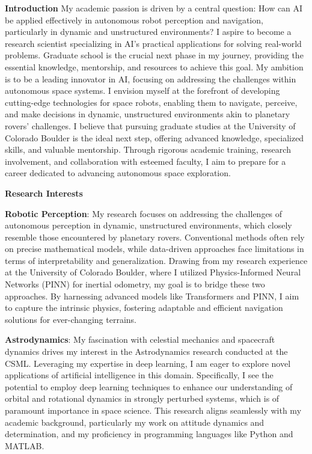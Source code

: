 \documentclass[a4,20pt]{article}
\begin{document}
\begin{large} 

\textbf{Introduction} \newline
My academic passion is driven by a central question: How can AI be applied effectively in autonomous robot perception and navigation, particularly in dynamic and unstructured environments? I aspire to become a research scientist specializing in AI's practical applications for solving real-world problems. Graduate school is the crucial next phase in my journey, providing the essential knowledge, mentorship, and resources to achieve this goal. My ambition is to be a leading innovator in AI, focusing on addressing the challenges within autonomous space systems. I envision myself at the forefront of developing cutting-edge technologies for space robots, enabling them to navigate, perceive, and make decisions in dynamic, unstructured environments akin to planetary rovers' challenges. I believe that pursuing graduate studies at the University of Colorado Boulder is the ideal next step, offering advanced knowledge, specialized skills, and valuable mentorship. Through rigorous academic training, research involvement, and collaboration with esteemed faculty, I aim to prepare for a career dedicated to advancing autonomous space exploration.

\textbf{Research Interests} \vspace{-0.35cm}

\textbf{Robotic Perception}: My research focuses on addressing the challenges of autonomous perception in dynamic, unstructured environments, which closely resemble those encountered by planetary rovers. Conventional methods often rely on precise mathematical models, while data-driven approaches face limitations in terms of interpretability and generalization. Drawing from my research experience at the University of Colorado Boulder, where I utilized Physics-Informed Neural Networks (PINN) for inertial odometry, my goal is to bridge these two approaches. By harnessing advanced models like Transformers and PINN, I aim to capture the intrinsic physics, fostering adaptable and efficient navigation solutions for ever-changing terrains.\vspace{-0.35cm}


\textbf{Astrodynamics}: My fascination with celestial mechanics and spacecraft dynamics drives my interest in the Astrodynamics research conducted at the CSML. Leveraging my expertise in deep learning, I am eager to explore novel applications of artificial intelligence in this domain. Specifically, I see the potential to employ deep learning techniques to enhance our understanding of orbital and rotational dynamics in strongly perturbed systems, which is of paramount importance in space science. This research aligns seamlessly with my academic background, particularly my work on attitude dynamics and determination, and my proficiency in programming languages like Python and MATLAB.\vspace{-0.35cm}


\end{large}
\end{document}
